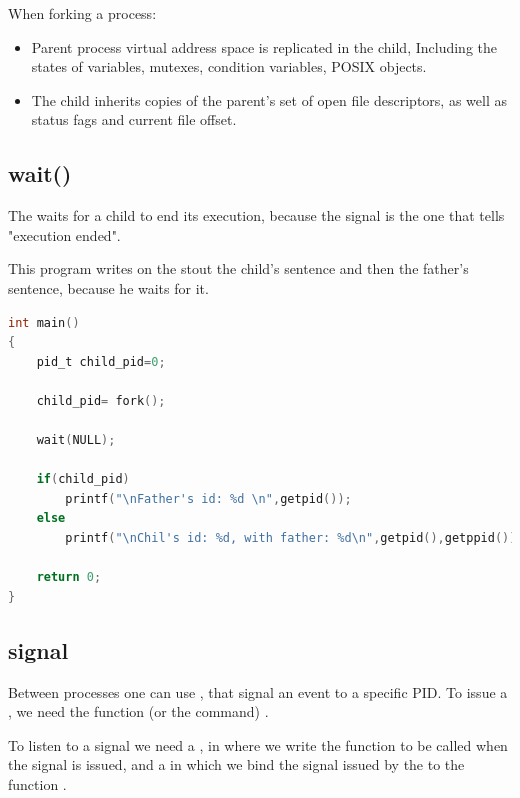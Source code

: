 When forking a process:
\begin{itemize}
	\item Parent process virtual address space is replicated in the child, Including the states of variables, mutexes, condition variables, POSIX objects.
	\item The child inherits copies of the parent's set of open file descriptors, as well as status fags and current file offset.
\end{itemize}

\subsection{wait()}
The  waits for a child to end its execution, because the signal  is the one that tells "execution ended". 

This program writes on the stout the child's sentence and then the father's sentence, because he waits for it.
\begin{lstlisting}[language=C]
int main()
{
	pid_t child_pid=0;
	
	child_pid= fork();
	
	wait(NULL);
	
	if(child_pid)
		printf("\nFather's id: %d \n",getpid());
	else
		printf("\nChil's id: %d, with father: %d\n",getpid(),getppid());

	return 0;
}

\end{lstlisting}

\subsection{signal}
Between processes one can use , that signal an event to a specific PID.
To issue a , we need the function (or the command) .

To listen to a signal we need a , in where we write the function to be called when the signal is issued, and a  in which we bind the signal issued by the  to the function .
